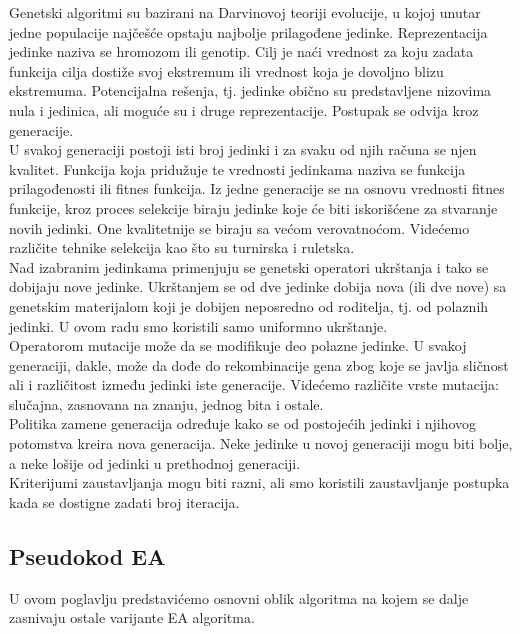 \documentclass{article}
\begin{document}
Genetski algoritmi \cite{vi_Janicic} su bazirani na Darvinovoj teoriji evolucije, u kojoj unutar jedne populacije najčešće opstaju najbolje prilagođene jedinke. Reprezentacija jedinke naziva se hromozom ili genotip. Cilj je naći vrednost za koju zadata funkcija cilja dostiže svoj ekstremum ili vrednost koja je dovoljno blizu ekstremuma. Potencijalna rešenja, tj. jedinke obično su predstavljene nizovima nula i jedinica, ali moguće su i druge reprezentacije. Postupak se odvija kroz generacije.\\

U svakoj generaciji postoji isti broj jedinki i za svaku od njih računa se njen kvalitet. Funkcija koja pridužuje te vrednosti jedinkama naziva se funkcija prilagođenosti ili fitnes funkcija. Iz jedne generacije se na osnovu vrednosti fitnes funkcije, kroz proces selekcije biraju jedinke koje će biti iskorišćene za stvaranje novih jedinki. One kvalitetnije se biraju sa većom verovatnoćom. Videćemo različite tehnike selekcija kao što su turnirska i ruletska. \\

Nad izabranim jedinkama primenjuju se genetski operatori ukrštanja i tako se dobijaju nove jedinke. Ukrštanjem se od dve jedinke dobija nova (ili dve nove) sa genetskim materijalom koji je dobijen neposredno od roditelja, tj. od polaznih jedinki. U ovom radu smo koristili samo uniformno ukrštanje. \\

Operatorom mutacije može da se modifikuje deo polazne jedinke. U svakoj generaciji, dakle, može da dođe do rekombinacije gena zbog koje se javlja sličnost ali i različitost između jedinki iste generacije. Videćemo različite vrste mutacija: slučajna, zasnovana na znanju, jednog bita i ostale. \\

Politika zamene generacija određuje kako se od postojećih jedinki i njihovog potomstva kreira nova generacija. Neke jedinke u novoj generaciji mogu biti bolje, a neke lošije od jedinki u prethodnoj generaciji. \\

Kriterijumi zaustavljanja mogu biti razni, ali smo koristili zaustavljanje postupka kada se dostigne zadati broj iteracija.

\subsection{Pseudokod EA}
\label{sec:ea_preudokod}

U ovom poglavlju predstavićemo osnovni oblik algoritma na kojem se dalje zasnivaju ostale varijante EA algoritma. 
\end{document}
